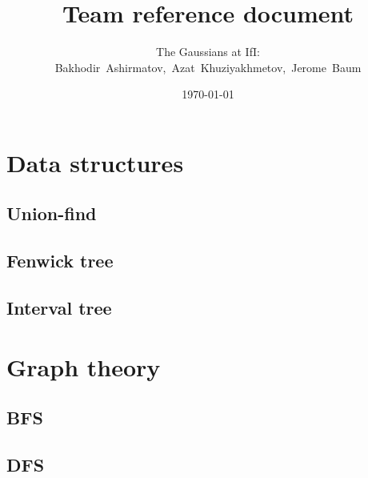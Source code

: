 \documentclass[12pt,a4paper]{article}
\begin{document}
\author{The Gaussians at IfI: Bakhodir~Ashirmatov,~Azat~Khuziyakhmetov,~Jerome~Baum}
\title{\vspace{-8ex}Team reference document}
\date{\today}

\maketitle

\tableofcontents

\newpage

\section{Data structures}

\subsection{Union-find}



\subsection{Fenwick tree}



\subsection{Interval tree}



\section{Graph theory}

\subsection{BFS}



\subsection{DFS}
\end{document}
